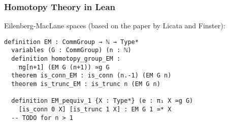 \documentclass[xcolor=table]{beamer}
\begin{document}









\begin{frame}[fragile]
\frametitle{Homotopy Theory in Lean}
Eilenberg-MacLane spaces (based on the paper by Licata and Finster):
\begin{lstlisting}[gobble=2]
  definition EM : CommGroup → ℕ → Type*
  variables (G : CommGroup) (n : ℕ)
  definition homotopy_group_EM :
    πg[n+1] (EM G (n+1)) ≃g G
  theorem is_conn_EM : is_conn (n.-1) (EM G n)
  theorem is_trunc_EM : is_trunc n (EM G n)

  definition EM_pequiv_1 {X : Type*} (e : π₁ X ≃g G)
    [is_conn 0 X] [is_trunc 1 X] : EM G 1 ≃* X
  -- TODO for n > 1
\end{lstlisting}


\end{frame}
\end{document}
